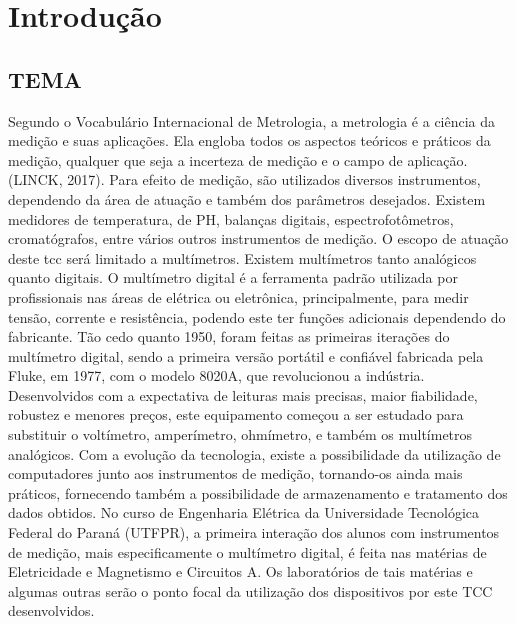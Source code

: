 
\chapter{Introdução}\label{cap:introducao}

\section{TEMA}\label{sec:tema}
Segundo o Vocabulário Internacional de Metrologia, a metrologia é a ciência da medição e suas aplicações. Ela engloba todos os aspectos teóricos e práticos da medição, qualquer que seja a incerteza de medição e o campo de aplicação. (LINCK, 2017).
Para efeito de medição, são utilizados diversos instrumentos, dependendo da área de atuação e também dos parâmetros desejados. Existem medidores de temperatura, de PH, balanças digitais, espectrofotômetros, cromatógrafos, entre vários outros instrumentos de medição. O escopo de atuação deste tcc será limitado a multímetros. Existem multímetros tanto analógicos quanto digitais.
O multímetro digital é a ferramenta padrão utilizada por profissionais nas áreas de elétrica ou eletrônica, principalmente, para medir tensão, corrente e resistência, podendo este ter funções adicionais dependendo do fabricante.
	Tão cedo quanto 1950, foram feitas as primeiras iterações do multímetro digital, sendo a primeira versão portátil e confiável fabricada pela Fluke, em 1977, com o modelo 8020A, que revolucionou a indústria. Desenvolvidos com a expectativa de leituras mais precisas, maior fiabilidade, robustez e menores preços, este equipamento começou a ser estudado para substituir o voltímetro, amperímetro, ohmímetro, e também os multímetros analógicos. 
	Com a evolução da tecnologia, existe a possibilidade da utilização de computadores junto aos instrumentos de medição, tornando-os ainda mais práticos, fornecendo também a possibilidade de armazenamento e tratamento dos dados obtidos.
	No curso de Engenharia Elétrica da Universidade Tecnológica Federal do Paraná (UTFPR), a primeira interação dos alunos com instrumentos de medição, mais especificamente o multímetro digital, é feita nas matérias de Eletricidade e Magnetismo e Circuitos A. Os laboratórios de tais matérias e algumas outras serão o ponto focal da utilização dos dispositivos por este TCC desenvolvidos.

